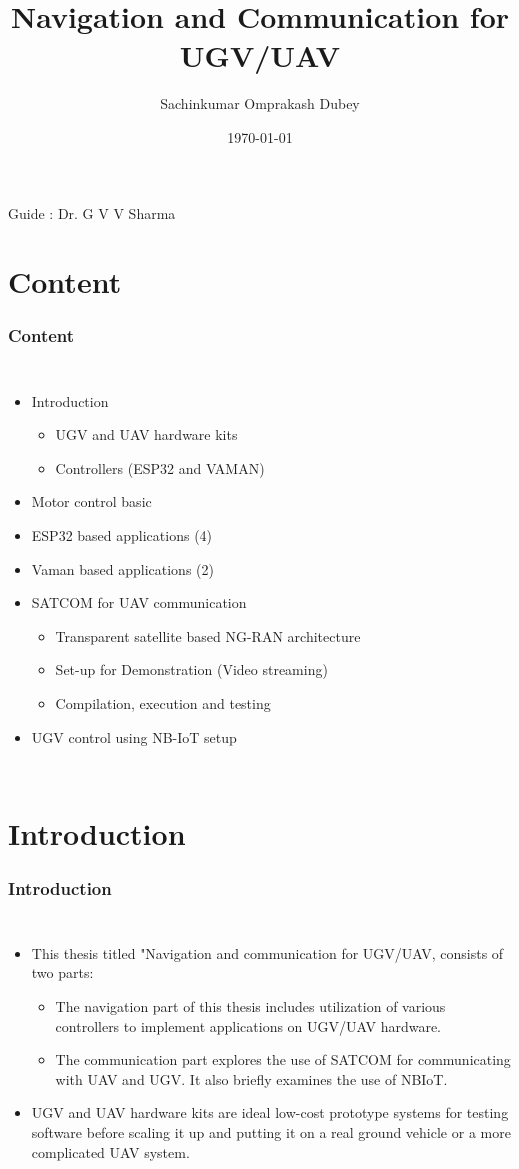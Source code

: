 \documentclass[xcolor=table]{beamer}
\title{Navigation and Communication for UGV/UAV}
\author{Sachinkumar Omprakash Dubey}
\institute{Indian Institute of Technology, Hyderabad.}
\date{\today}
\begin{document}
\begin{frame}
\titlepage
\centering
\small{Guide : Dr. G V V Sharma }
\end{frame}
\section{Content}
\begin{frame}
\frametitle{Content}
\begin{columns}
  \begin{itemize}
  \item Introduction
  \begin{itemize}
  	\item UGV and UAV hardware kits
  	\item Controllers (ESP32 and VAMAN)
  \end{itemize}
  \item Motor control basic
  \item ESP32 based applications (4)
  \item Vaman based applications (2)
  \item SATCOM for UAV communication
  \begin{itemize}
  	\item Transparent satellite based NG-RAN architecture
  	\item Set-up for Demonstration (Video streaming)
  	\item Compilation, execution and testing
  \end{itemize}
  \item UGV control using NB-IoT setup
  \end{itemize}
\end{columns}

\end{frame}


\section{Introduction}
\begin{frame}
\frametitle{Introduction}
\begin{columns}
  \begin{itemize}
  \item This thesis titled "Navigation and communication for UGV/UAV, consists of two parts:
   \begin{itemize}
  \item The navigation part of this thesis includes utilization of various controllers to implement applications on UGV/UAV hardware.
  \item The communication part explores the use of SATCOM for communicating with UAV and UGV. It also briefly examines the use of NBIoT.
  \end{itemize}
  \item UGV and UAV hardware kits are ideal low-cost prototype systems for testing software before scaling it up and putting it on a real ground vehicle or a more complicated UAV system. 
  \end{itemize}
\end{columns}
\end{frame}
\end{document}
